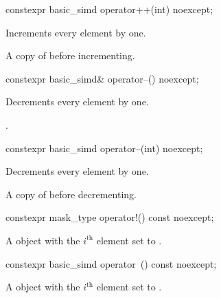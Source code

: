 \begin{itemdecl}
constexpr basic_simd operator++(int) noexcept;
\end{itemdecl}

\begin{itemdescr}
  \pnum{}

  \pnum\effects
  Increments every element by one.

  \pnum\returns
  A copy of  before incrementing.
\end{itemdescr}

\begin{itemdecl}
constexpr basic_simd& operator--() noexcept;
\end{itemdecl}

\begin{itemdescr}
  \pnum{}

  \pnum\effects
  Decrements every element by one.

  \pnum\returns
  .
\end{itemdescr}

\begin{itemdecl}
constexpr basic_simd operator--(int) noexcept;
\end{itemdecl}

\begin{itemdescr}
  \pnum{}

  \pnum\effects
  Decrements every element by one.

  \pnum\returns
  A copy of  before decrementing.
\end{itemdescr}

\begin{itemdecl}
constexpr mask_type operator!() const noexcept;
\end{itemdecl}

\begin{itemdescr}
  \pnum{}

  \pnum\returns
  A  object with the $i^\text{th}$ element set to  \foralli.
\end{itemdescr}

\begin{itemdecl}
constexpr basic_simd operator~() const noexcept;
\end{itemdecl}

\begin{itemdescr}
  \pnum{}

  \pnum\returns
  A  object with the $i^\text{th}$ element set to  \foralli.
\end{itemdescr}

